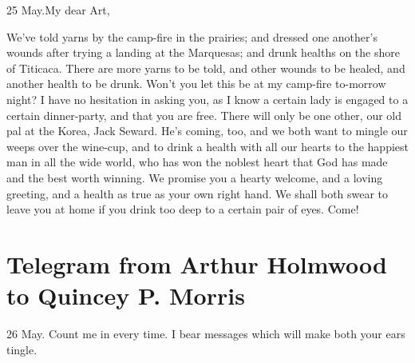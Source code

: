 \begin{mail}{25 May.}{My dear Art,}

We've told yarns by the camp-fire in the prairies; and dressed one another's wounds after trying a landing at the Marquesas; and drunk healths on the shore of Titicaca. There are more yarns to be told, and other wounds to be healed, and another health to be drunk. Won't you let this be at my camp-fire to-morrow night? I have no hesitation in asking you, as I know a certain lady is engaged to a certain dinner-party, and that you are free. There will only be one other, our old pal at the Korea, Jack Seward. He's coming, too, and we both want to mingle our weeps over the wine-cup, and to drink a health with all our hearts to the happiest man in all the wide world, who has won the noblest heart that God has made and the best worth winning. We promise you a hearty welcome, and a loving greeting, and a health as true as your own right hand. We shall both swear to leave you at home if you drink too deep to a certain pair of eyes. Come!

\end{mail}

\section{Telegram from Arthur Holmwood to Quincey P\@. Morris}
\begin{telegram}[Art.]{26 May.}
Count me in every time. I bear messages which will make both your ears tingle.
\end{telegram}
